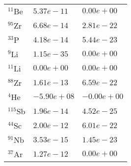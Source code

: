 \begin{tabular}{lll}
 $^{11}$Be  & $5.37e-11 $                                                        & $0.00e+00 $                                                                     \\
 $^{95}$Zr  & $6.68e-14 $                                                        & $2.81e-22 $                                                                     \\
 $^{33}$P   & $4.18e-14 $                                                        & $5.44e-23 $                                                                     \\
 $^{9}$Li   & $1.15e-35 $                                                        & $0.00e+00 $                                                                     \\
 $^{11}$Li  & $0.00e+00 $                                                        & $0.00e+00 $                                                                     \\
 $^{88}$Zr  & $1.61e-13 $                                                        & $6.59e-22 $                                                                     \\
 $^{4}$He   & $-5.90e+08 $                                                       & $-0.00e+00 $                                                                    \\
 $^{115}$Sb & $1.96e-14 $                                                        & $4.52e-25 $                                                                     \\
 $^{44}$Sc  & $2.00e-12 $                                                        & $6.01e-22 $                                                                     \\
 $^{91}$Nb  & $3.53e-15 $                                                        & $1.45e-23 $                                                                     \\
 $^{37}$Ar  & $1.27e-12 $                                                        & $0.00e+00 $                                                                     \\
\hline
\end{tabular}
